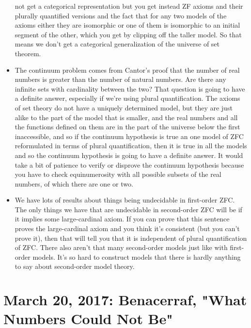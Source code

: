 \documentclass[12pt]{article}
\theoremstyle{definition}
\begin{document}
\begin{itemize}
        not get a categorical representation but you get instead ZF axioms and
        their plurally quantified versions and the fact that for any two models
        of the axioms either they are isomorphic or one of them is isomorphic
        to an initial segment of the other, which you get by clipping off the
        taller model. So that means we don't get a categorical generalization
        of the universe of set theorem.
    \item
        The continuum problem comes from Cantor's proof that the number of real
        numbers is greater than the number of natural numbers. Are there any
        infinite sets with cardinality between the two? That question is going
        to have a definite answer, especially if we're using plural
        quantification. The axioms of set theory do not have a uniquely
        determined model, but they are just alike to the part of the model that
        is smaller, and the real numbers and all the functions defined on them
        are in the part of the universe below the first inaccessible, and so if
        the continuum hypothesis is true an one model of ZFC reformulated in
        terms of plural quantification, then it is true in all the models and
        so the continuum hypothesis is going to have a definite answer. It
        would take a bit of patience to verify or disprove the continuum
        hypothesis because you have to check equinumerosity with all possible
        subsets of the real numbers, of which there are one or two.
    \item
        We have lots of results about things being undecidable in first-order
        ZFC. The only things we have that are undecidable in second-order ZFC
        will be if it implies some large-cardinal axiom. If you can prove that
        this sentence proves the large-cardinal axiom and you think it's
        consistent (but you can't prove it), then that will tell you that it is
        independent of plural quantification of ZFC. There also aren't that
        many second-order models just like with first-order models. It's so
        hard to construct models that there is hardly anything to say about
        second-order model theory.
\end{itemize}

\section{March 20, 2017: Benacerraf, "What Numbers Could Not Be"}
\end{document}
